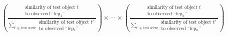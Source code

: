 \documentclass{tufte-book}
\begin{document}
\begin{landscape}
\begin{align*}
    \left(\frac{\begin{array}{c}\text{similarity of test object $t$}\\\text{to observed ``fep$_1$''}\end{array}}
    {\sum_{t' \in\, \text{test scene}}\begin{array}{c}\text{similarity of test object $t'$}\\\text{to observed ``fep$_1$''}\end{array}}\right)
    \times
    \cdots
    \times
    \left(\frac{\begin{array}{c}\text{similarity of test object $t$}\\\text{to observed ``fep$_n$''}\end{array}}
    {\sum_{t' \in\, \text{test scene}}\begin{array}{c}\text{similarity of test object $t'$}\\\text{to observed ``fep$_n$''}\end{array}}\right)
\end{align*}

\end{landscape}
\end{document}
